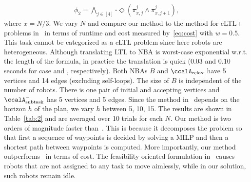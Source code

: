 \documentclass[Afour,sageh,times]{sagej}
\newcommand{\auto}[1]{\ccalA_{\text{#1}}}
\renewcommand{\ap}[3]{\mathcal{\pi}_{{#1},{#2}}^{#3}}
\newcommand{\RNum}[1]{\uppercase\expandafter{\romannumeral #1\relax}}
\begin{document}
{\small
\begin{align*}
   \phi_2 = \bigwedge\nolimits_{j\in[4]} \square \Diamond( \ap{x}{j}{j} \wedge \ap{x}{j+1}{j} ) ,
\end{align*}
\normalsize
where $x = N/3$. We vary $N$ and compare our method to the method for cLTL+ problems in~\cite{sahin2019multirobot} in terms of runtime and cost measured by~\eqref{eq:cost} with $w=0.5$. This task cannot be categorized as a cLTL problem since here robots are heterogeneous. {Although translating LTL to NBA is worst-case exponential w.r.t. the length of the formula, in practice the translation is quick (0.03 and 0.10 seconds for case \RNum{1} and \RNum{2}, respectively). Both NBAs $B$ and $\auto{relax}$ have 5 vertices and 14 edges (excluding self-loops). The size of $B$ is independent of the number of robots. There is one pair of initial and accepting vertices and  $\auto{subtask}^-$ has 5 vertices and 5 edges.} Since the method in~\cite{sahin2019multirobot} depends on the horizon $h$ of the plan, we vary $h$ between 5, 10, 15. The results  are shown in Table~\ref{tab:2} and are averaged over 10 trials for each $N$. Our method is two orders of magnitude faster than~\cite{sahin2019multirobot}. This is because it decomposes the problem so that first a sequence of waypoints is decided by solving a MILP and then a shortest path  between waypoints is computed. More importantly, our method outperforms~\cite{sahin2019multirobot} in terms of cost.  The feasibility-oriented formulation in~\cite{sahin2019multirobot} causes robots that are not assigned to any task to move aimlessly, while in our solution, such robots remain idle.

}
\end{document}
